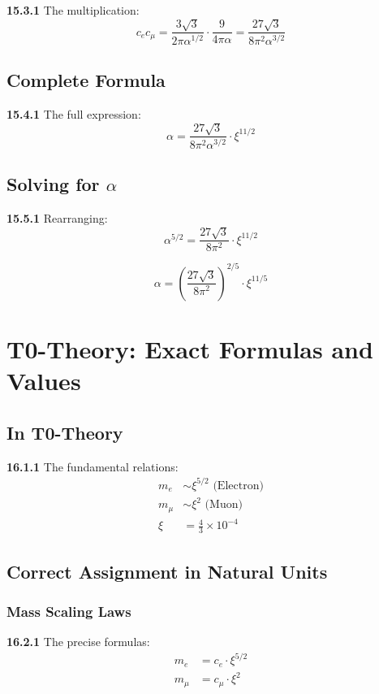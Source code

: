 \documentclass[12pt,a4paper]{article}
\newcommand{\xipar}{\xi}
\begin{document}
\noindent \textbf{15.3.1} The multiplication:
\[
c_e c_\mu = \frac{3\sqrt{3}}{2\pi\alpha^{1/2}} \cdot \frac{9}{4\pi\alpha} = \frac{27\sqrt{3}}{8\pi^2\alpha^{3/2}}
\]

\subsection{Complete Formula}

\noindent \textbf{15.4.1} The full expression:
\[
\alpha = \frac{27\sqrt{3}}{8\pi^2\alpha^{3/2}} \cdot \xi^{11/2}
\]

\subsection{Solving for $\alpha$}

\noindent \textbf{15.5.1} Rearranging:
\[
\alpha^{5/2} = \frac{27\sqrt{3}}{8\pi^2} \cdot \xi^{11/2}
\]

\[
\alpha = \left(\frac{27\sqrt{3}}{8\pi^2}\right)^{2/5} \cdot \xi^{11/5}
\]


\section{T0-Theory: Exact Formulas and Values}

\subsection{In T0-Theory}

\noindent \textbf{16.1.1} The fundamental relations:
\begin{align}
	m_e &\sim \xi^{5/2} \text{ (Electron)} \\
	m_\mu &\sim \xi^2 \text{ (Muon)} \\
	\xi &= \frac{4}{3} \times 10^{-4} 
\end{align}

\subsection{Correct Assignment in Natural Units}

\subsubsection{Mass Scaling Laws}
\noindent \textbf{16.2.1} The precise formulas:
\begin{align}
	m_e &= c_e \cdot \xipar^{5/2} \\
	m_\mu &= c_\mu \cdot \xipar^2
\end{align}
\end{document}
